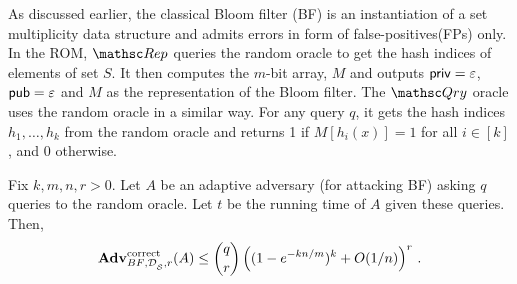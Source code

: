 As discussed earlier, the classical Bloom filter (BF) is an instantiation of a set multiplicity data structure and admits errors in form of false-positives(FPs) only. In the ROM, $\Rep$ queries the random oracle to get the hash indices of elements of set $S$. It then computes the $m$-bit array, $M$ and outputs ${\sf priv}=\varepsilon$, ${\sf pub} = \varepsilon$ and $M$ as the representation of
the Bloom filter. The $\Qry$ oracle uses the random oracle in a similar way. For any query $q$, it gets the hash indices $h_1, \ldots, h_k$ from the random oracle and returns 1 if $M[h_i(x)]=1$ for all $i\in [k]$, and 0 otherwise.
\begin{theorem}\label{thm3}
Fix $k,m,n,r>0$. Let $A$ be an adaptive adversary (for attacking BF) asking $q$ queries to the random oracle. Let $t$ be the running time of $A$ given these queries. Then, 
\[
\mathrm{\mathbf{Adv}}^{\mathrm{correct}}_{{BF},\mathcal{D}_{{\cal S}}^{},r}(A) \leq  {\dbinom{q}{r}} \left( (1-e^{-kn/m})^k + O(1/n) \right)^r\,.
\]
\end{theorem}

